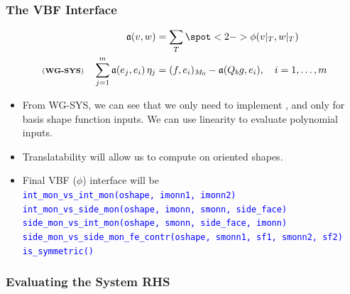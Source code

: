 \documentclass[compress]{beamer}
\begin{document}
\begin{frame}
  \frametitle{The VBF Interface}
  \vspace{-.40cm}
  \begin{align*}
    \mathfrak{a}(v,w) &= \sum_T { \spot<2->{\phi}(v|_T,w|_T) }\\
    \text{\scriptsize (\textbf{WG-SYS})} \quad \sum_{j=1}^m{\mathfrak{a}(e_j, e_i) \,\eta_j} &= (f, e_i)_{M_0} - \mathfrak{a}(Q_b g, e_i),
      \quad i=1,\dots,m
  \end{align*}
  \pause
  \begin{itemize}[<+->]
    \item From {\scriptsize WG-SYS}, we can see that we only need to implement , and only for basis shape function inputs.
      We can use linearity to evaluate polynomial inputs.
    \item Translatability will allow us to compute on oriented shapes.
    \item Final VBF ($\phi$) interface will be\\
    \uncover<+-> {
    \texttt{\small \textcolor{blue}{int\_mon\_vs\_int\_mon(oshape, imonn1, imonn2)}}\\
    \uncover<+-> {
    \texttt{\small \textcolor{blue}{int\_mon\_vs\_side\_mon(oshape, imonn, smonn, side\_face)}}\\
    \uncover<+-> {
    \texttt{\small \textcolor{blue}{side\_mon\_vs\_int\_mon(oshape, smonn, side\_face, imonn)}}\\
    \uncover<+-> {
    \texttt{\small \textcolor{blue}{side\_mon\_vs\_side\_mon\_fe\_contr({\scriptsize oshape, smonn1, sf1, smonn2, sf2})}}\\
    \uncover<+-> {
    \texttt{\small \textcolor{blue}{is\_symmetric() }}
    }}}}}
  \end{itemize}
\end{frame}


\subsubsection{Evaluating the System RHS}
\end{document}
